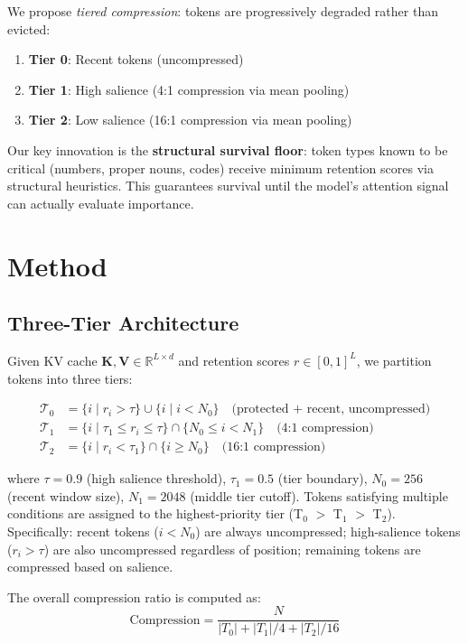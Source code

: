 \documentclass[11pt]{article}
\begin{document}
We propose \textit{tiered compression}: tokens are progressively degraded rather than evicted:
\begin{enumerate}
    \item \textbf{Tier 0}: Recent tokens (uncompressed)
    \item \textbf{Tier 1}: High salience (4:1 compression via mean pooling)
    \item \textbf{Tier 2}: Low salience (16:1 compression via mean pooling)
\end{enumerate}

Our key innovation is the \textbf{structural survival floor}: token types known to be critical (numbers, proper nouns, codes) receive minimum retention scores via structural heuristics. This guarantees survival until the model's attention signal can actually evaluate importance.

\section{Method}

\subsection{Three-Tier Architecture}

Given KV cache $\mathbf{K}, \mathbf{V} \in \mathbb{R}^{L \times d}$ and retention scores $r \in [0,1]^L$, we partition tokens into three tiers:

\begin{align}
\mathcal{T}_0 &= \{i \mid r_i > \tau\} \cup \{i \mid i < N_0\} \quad \text{(protected + recent, uncompressed)} \\
\mathcal{T}_1 &= \{i \mid \tau_1 \leq r_i \leq \tau\} \cap \{N_0 \leq i < N_1\} \quad \text{(4:1 compression)} \\
\mathcal{T}_2 &= \{i \mid r_i < \tau_1\} \cap \{i \geq N_0\} \quad \text{(16:1 compression)}
\end{align}

where $\tau=0.9$ (high salience threshold), $\tau_1=0.5$ (tier boundary), $N_0=256$ (recent window size), $N_1=2048$ (middle tier cutoff). Tokens satisfying multiple conditions are assigned to the highest-priority tier (T$_0$ $>$ T$_1$ $>$ T$_2$). Specifically: recent tokens ($i < N_0$) are always uncompressed; high-salience tokens ($r_i > \tau$) are also uncompressed regardless of position; remaining tokens are compressed based on salience.

The overall compression ratio is computed as:
\begin{equation}
\text{Compression} = \frac{N}{|T_0| + |T_1|/4 + |T_2|/16}
\end{equation}
\end{document}
